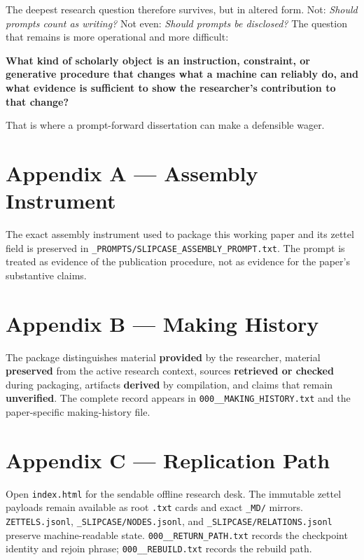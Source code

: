 \documentclass[
]{article}
\begin{document}
The deepest research question therefore survives, but in altered form.
Not: \emph{Should prompts count as writing?} Not even: \emph{Should
prompts be disclosed?} The question that remains is more operational and
more difficult:

\textbf{What kind of scholarly object is an instruction, constraint, or
generative procedure that changes what a machine can reliably do, and
what evidence is sufficient to show the researcher's contribution to
that change?}

That is where a prompt-forward dissertation can make a defensible wager.

\section{Appendix A --- Assembly
Instrument}\label{appendix-a-assembly-instrument}

The exact assembly instrument used to package this working paper and its
zettel field is preserved in
\texttt{\_PROMPTS/SLIPCASE\_ASSEMBLY\_PROMPT.txt}. The prompt is treated
as evidence of the publication procedure, not as evidence for the
paper's substantive claims.

\section{Appendix B --- Making History}\label{appendix-b-making-history}

The package distinguishes material \textbf{provided} by the researcher,
material \textbf{preserved} from the active research context, sources
\textbf{retrieved or checked} during packaging, artifacts
\textbf{derived} by compilation, and claims that remain
\textbf{unverified}. The complete record appears in
\texttt{000\_\_MAKING\_HISTORY.txt} and the paper-specific
making-history file.

\section{Appendix C --- Replication
Path}\label{appendix-c-replication-path}

Open \texttt{index.html} for the sendable offline research desk. The
immutable zettel payloads remain available as root \texttt{.txt} cards
and exact \texttt{\_MD/} mirrors. \texttt{ZETTELS.jsonl},
\texttt{\_SLIPCASE/NODES.jsonl}, and \texttt{\_SLIPCASE/RELATIONS.jsonl}
preserve machine-readable state. \texttt{000\_\_RETURN\_PATH.txt}
records the checkpoint identity and rejoin phrase;
\texttt{000\_\_REBUILD.txt} records the rebuild path.
\end{document}

